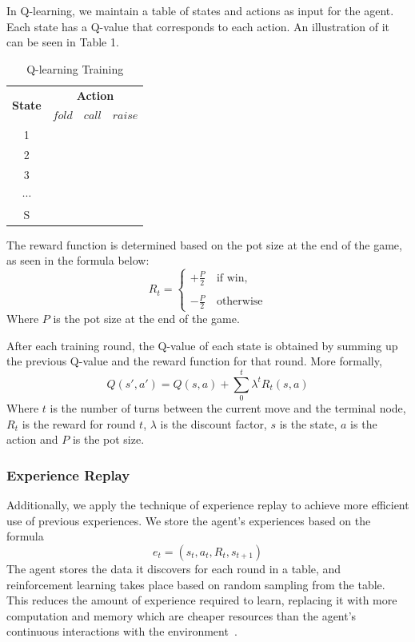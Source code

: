 \documentclass{article}
\begin{document}
In Q-learning, we maintain a table of states and actions as input for the agent. Each state has a Q-value that corresponds to each action. An illustration of it can be seen in Table 1.

\begin{table}[h!]
  \begin{center}
	\begin{tabular}{ c|c|c|c }
	\hline
	\multirow{2}{*}{\textbf{State}}&\multicolumn{3}{|c}{\textbf{Action}}\\
	\cline{2-4}
	& $fold$ & $call$ & $raise$\\ 
	\hline
	1\\
	2\\ 
	3\\ 
	$\cdots$\\
	S\\
	\hline
	\end{tabular}
	\caption{Q-learning Training}
    \label{tab:table1}
  \end{center}
\end{table}
The reward function is determined based on the pot size at the end of the game, as seen in the formula below:
\begin{displaymath}
  R_t=
  \left\lbrace
  \begin{array}{l}
    +\frac{P}{2}\quad\text{if win,} \\
    \\
    -\frac{P}{2}\quad\text{otherwise}
  \end{array}
  \right.
\end{displaymath}
\noindent Where $P$ is the pot size at the end of the game.

After each training round, the Q-value of each state is obtained by summing up the previous Q-value and the reward function for that round. More formally,
\begin{displaymath}
Q\left(s',a'\right)=Q\left(s,a\right)+\sum_{0}^{t}\lambda^{t}R_t\left(s,a\right)
\end{displaymath}
\noindent Where $t$ is the number of turns between the current move and the terminal node, $R_t$ is the reward for round $t$, $\lambda$ is the discount factor, $s$ is the state, $a$ is the action and $P$ is the pot size.

\subsubsection{Experience Replay}
Additionally, we apply the technique of experience replay to achieve more efficient use of previous experiences. We store the agent's experiences based on the formula
\begin{displaymath}
e_t=\left(s_t,a_t,R_t,s_{t+1}\right)
\end{displaymath}
The agent stores the data it discovers for each round in a table, and reinforcement learning takes place based on random sampling from the table. This reduces the amount of experience required to learn, replacing it with more computation and memory which are cheaper resources than the agent's continuous interactions with the environment~\cite{sqas:replay}.
\end{document}
